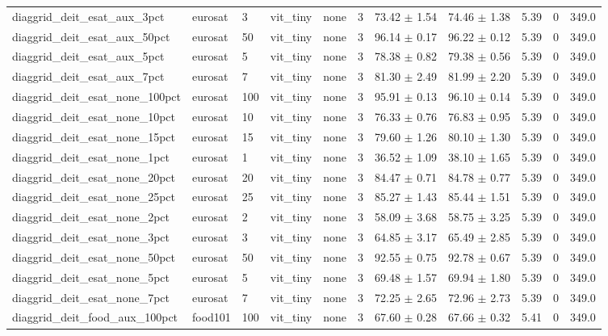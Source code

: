 \begin{tabular}{lllllllllll}
diaggrid_deit_esat_aux_3pct & eurosat & 3 & vit_tiny & none & 3 & 73.42 $\pm$ 1.54 & 74.46 $\pm$ 1.38 & 5.39 & 0 & 349.0 \\
diaggrid_deit_esat_aux_50pct & eurosat & 50 & vit_tiny & none & 3 & 96.14 $\pm$ 0.17 & 96.22 $\pm$ 0.12 & 5.39 & 0 & 349.0 \\
diaggrid_deit_esat_aux_5pct & eurosat & 5 & vit_tiny & none & 3 & 78.38 $\pm$ 0.82 & 79.38 $\pm$ 0.56 & 5.39 & 0 & 349.0 \\
diaggrid_deit_esat_aux_7pct & eurosat & 7 & vit_tiny & none & 3 & 81.30 $\pm$ 2.49 & 81.99 $\pm$ 2.20 & 5.39 & 0 & 349.0 \\
diaggrid_deit_esat_none_100pct & eurosat & 100 & vit_tiny & none & 3 & 95.91 $\pm$ 0.13 & 96.10 $\pm$ 0.14 & 5.39 & 0 & 349.0 \\
diaggrid_deit_esat_none_10pct & eurosat & 10 & vit_tiny & none & 3 & 76.33 $\pm$ 0.76 & 76.83 $\pm$ 0.95 & 5.39 & 0 & 349.0 \\
diaggrid_deit_esat_none_15pct & eurosat & 15 & vit_tiny & none & 3 & 79.60 $\pm$ 1.26 & 80.10 $\pm$ 1.30 & 5.39 & 0 & 349.0 \\
diaggrid_deit_esat_none_1pct & eurosat & 1 & vit_tiny & none & 3 & 36.52 $\pm$ 1.09 & 38.10 $\pm$ 1.65 & 5.39 & 0 & 349.0 \\
diaggrid_deit_esat_none_20pct & eurosat & 20 & vit_tiny & none & 3 & 84.47 $\pm$ 0.71 & 84.78 $\pm$ 0.77 & 5.39 & 0 & 349.0 \\
diaggrid_deit_esat_none_25pct & eurosat & 25 & vit_tiny & none & 3 & 85.27 $\pm$ 1.43 & 85.44 $\pm$ 1.51 & 5.39 & 0 & 349.0 \\
diaggrid_deit_esat_none_2pct & eurosat & 2 & vit_tiny & none & 3 & 58.09 $\pm$ 3.68 & 58.75 $\pm$ 3.25 & 5.39 & 0 & 349.0 \\
diaggrid_deit_esat_none_3pct & eurosat & 3 & vit_tiny & none & 3 & 64.85 $\pm$ 3.17 & 65.49 $\pm$ 2.85 & 5.39 & 0 & 349.0 \\
diaggrid_deit_esat_none_50pct & eurosat & 50 & vit_tiny & none & 3 & 92.55 $\pm$ 0.75 & 92.78 $\pm$ 0.67 & 5.39 & 0 & 349.0 \\
diaggrid_deit_esat_none_5pct & eurosat & 5 & vit_tiny & none & 3 & 69.48 $\pm$ 1.57 & 69.94 $\pm$ 1.80 & 5.39 & 0 & 349.0 \\
diaggrid_deit_esat_none_7pct & eurosat & 7 & vit_tiny & none & 3 & 72.25 $\pm$ 2.65 & 72.96 $\pm$ 2.73 & 5.39 & 0 & 349.0 \\
diaggrid_deit_food_aux_100pct & food101 & 100 & vit_tiny & none & 3 & 67.60 $\pm$ 0.28 & 67.66 $\pm$ 0.32 & 5.41 & 0 & 349.0 \\

\end{tabular}
